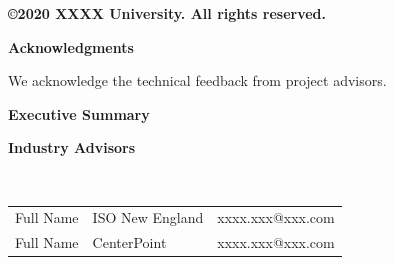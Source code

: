 \documentclass[letterpaper, 12pt, oneside]{book}
\theoremstyle{plain}
\theoremstyle{definition}
\theoremstyle{remark}
\begin{document}
\vspace{50pt}
\begin{center}
\textbf{\copyright  2020 XXXX University. All rights reserved.} 
\end{center}

\newpage
{} %
\begin{large}
\begin{center}
\textbf{Acknowledgments} 
\end{center}
\end{large}

We acknowledge the technical feedback from project advisors. 

\lipsum[3]

\newpage

\begin{large}
\begin{center}
\textbf{Executive Summary} 
\end{center}
\end{large}

\begin{spacing}{1.3}

\lipsum[5]


\newpage
\begin{large}
\textbf{Industry Advisors} 
\end{large}$\quad$

\begin{table}[h]
  \centering

  \begin{tabular}{lll}
Full Name & ISO New England & xxxx.xxx@xxx.com \\
Full Name & CenterPoint & xxxx.xxx@xxx.com \\
\end{tabular}
\end{table}


\end{spacing}
\end{document}
